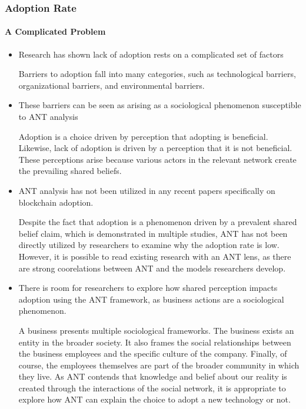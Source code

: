 \begin{frame}
  \frametitle{Adoption Rate}
  \framesubtitle{A Complicated Problem}
  \begin{itemize}
    \item<1-> Research has shown lack of adoption rests on a complicated set of factors

           {\scriptsize{Barriers to adoption fall into many categories, such as technological barriers, organizational barriers, and environmental barriers.}}

    \item<2-> These barriers can be seen as arising as a sociological phenomenon susceptible to ANT analysis

           {\scriptsize{Adoption is a choice driven by perception that adopting is beneficial. Likewise, lack of adoption is driven by a perception that it is not beneficial. These perceptions arise because various actors in the relevant network create the prevailing shared beliefs.}}

    \item<3-> ANT analysis has not been utilized in any recent papers specifically on blockchain adoption.

           {\scriptsize{Despite the fact that adoption is a phenomenon driven by a prevalent shared belief claim, which is demonstrated in multiple studies, ANT has not been directly utilized by researchers to examine why the adoption rate is low. However, it is possible to read existing research with an ANT lens, as there are strong coorelations between ANT and the models researchers develop.}}

    \item<4-> There is room for researchers to explore how shared perception impacts adoption using the ANT framework, as business actions are a sociological phenomenon.

          {\scriptsize{A business presents multiple sociological frameworks. The business exists an entity in the broader society. It also frames the social relationships between the business employees and the specific culture of the company. Finally, of course, the employees themselves are part of the broader community in which they live. As ANT contends that knowledge and belief about our reality is created through the interactions of the social network, it is appropriate to explore how ANT can explain the choice to adopt a new technology or not. }}

  \end{itemize}
\end{frame}
